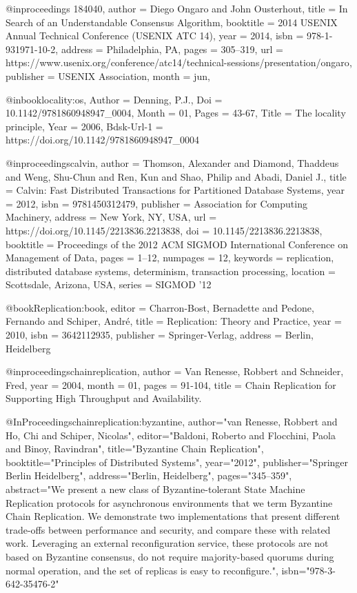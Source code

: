 @inproceedings {184040,
author = {Diego Ongaro and John Ousterhout},
title = {In Search of an Understandable Consensus Algorithm},
booktitle = {2014 {USENIX} Annual Technical Conference ({USENIX} {ATC} 14)},
year = {2014},
isbn = {978-1-931971-10-2},
address = {Philadelphia, PA},
pages = {305--319},
url = {https://www.usenix.org/conference/atc14/technical-sessions/presentation/ongaro},
publisher = {{USENIX} Association},
month = jun,
}


@inbook{locality:os,
	Author = {Denning, P.J.},
	Doi = {10.1142/9781860948947_0004},
	Month = {01},
	Pages = {43-67},
	Title = {The locality principle},
	Year = {2006},
	Bdsk-Url-1 = {https://doi.org/10.1142/9781860948947_0004}}

@inproceedings{calvin,
author = {Thomson, Alexander and Diamond, Thaddeus and Weng, Shu-Chun and Ren, Kun and Shao, Philip and Abadi, Daniel J.},
title = {Calvin: Fast Distributed Transactions for Partitioned Database Systems},
year = {2012},
isbn = {9781450312479},
publisher = {Association for Computing Machinery},
address = {New York, NY, USA},
url = {https://doi.org/10.1145/2213836.2213838},
doi = {10.1145/2213836.2213838},
booktitle = {Proceedings of the 2012 ACM SIGMOD International Conference on Management of Data},
pages = {1–12},
numpages = {12},
keywords = {replication, distributed database systems, determinism, transaction processing},
location = {Scottsdale, Arizona, USA},
series = {SIGMOD ’12}
}


@book{Replication:book,
editor = {Charron-Bost, Bernadette and Pedone, Fernando and Schiper, Andr\'{e}},
title = {Replication: Theory and Practice},
year = {2010},
isbn = {3642112935},
publisher = {Springer-Verlag},
address = {Berlin, Heidelberg}
}

@inproceedings{chainreplication,
author = {Van Renesse, Robbert and Schneider, Fred},
year = {2004},
month = {01},
pages = {91-104},
title = {Chain Replication for Supporting High Throughput and Availability.}
}

@InProceedings{chainreplication:byzantine,
author="van Renesse, Robbert
and Ho, Chi
and Schiper, Nicolas",
editor="Baldoni, Roberto
and Flocchini, Paola
and Binoy, Ravindran",
title="Byzantine Chain Replication",
booktitle="Principles of Distributed Systems",
year="2012",
publisher="Springer Berlin Heidelberg",
address="Berlin, Heidelberg",
pages="345--359",
abstract="We present a new class of Byzantine-tolerant State Machine Replication protocols for asynchronous environments that we term Byzantine Chain Replication. We demonstrate two implementations that present different trade-offs between performance and security, and compare these with related work. Leveraging an external reconfiguration service, these protocols are not based on Byzantine consensus, do not require majority-based quorums during normal operation, and the set of replicas is easy to reconfigure.",
isbn="978-3-642-35476-2"
}


